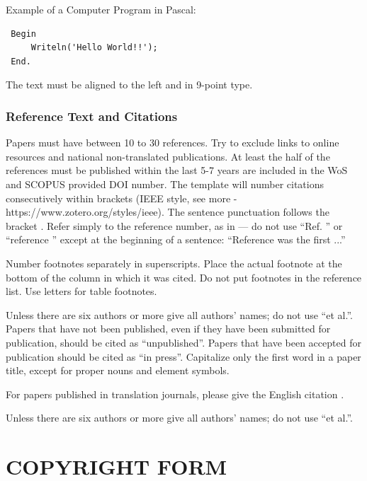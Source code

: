 \documentclass[a4paper,twoside]{article}
\begin{document}
Example of a Computer Program in Pascal:

\begin{small}
\begin{verbatim}
 Begin
     Writeln('Hello World!!');
 End.
\end{verbatim}
\end{small}


The text must be aligned to the left and in 9-point type.

\vfill
\subsubsection{Reference Text and Citations}

Papers must have between 10 to 30 references. Try to exclude links to online resources and national non-translated publications. At least the half of the references must be published within the last 5-7 years are included in the WoS and SCOPUS provided DOI number. The template will number citations consecutively within brackets \cite{eason1955certain} (IEEE style, see more - https://www.zotero.org/styles/ieee). The sentence punctuation follows the bracket \cite{maxwell1873treatise}. Refer simply to the reference number, as in \cite{maxwell1873treatise} --- do not use “Ref. \cite{maxwell1873treatise}” or “reference \cite{maxwell1873treatise}” except at the beginning of a sentence: “Reference \cite{maxwell1873treatise} was the first ...”


Number footnotes separately in superscripts. Place the actual footnote at the bottom of the column in which it was cited. Do not put footnotes in the reference list. Use letters for table footnotes.


Unless there are six authors or more give all authors’ names; do not use “et al.”. Papers that have not been published, even if they have been submitted for publication, should be cited as “unpublished”. Papers that have been accepted for publication should be cited as “in press”. Capitalize only the first word in a paper title, except for proper nouns and element symbols.


For papers published in translation journals, please give the English citation \cite{yorozu1987electron}.


Unless there are six authors or more give all authors’ names; do not use “et al.”.

\section{\uppercase{Copyright Form}}
\end{document}
